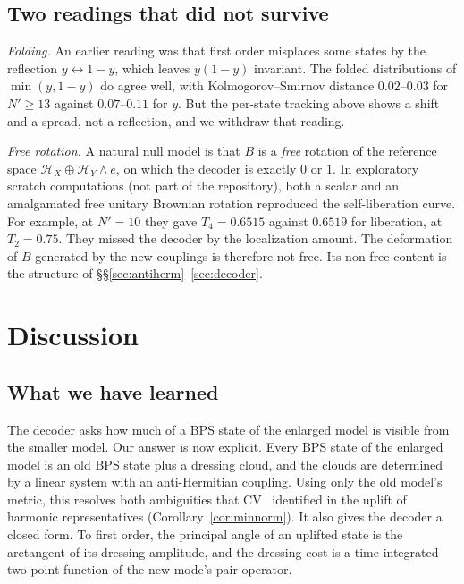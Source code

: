 \documentclass[11pt]{article}
\newcommand{\Np}{N'}
\newcommand{\Hc}{\mathcal H}
\theoremstyle{plain}
\theoremstyle{remark}
\numberwithin{equation}{section}
\begin{document}
\subsection{Two readings that did not survive}

\emph{Folding.} An earlier reading was that first order misplaces some states by the reflection $y\leftrightarrow1-y$,
which leaves $y(1-y)$ invariant. The folded distributions of $\min(y,1-y)$ do agree well, with Kolmogorov--Smirnov
distance $0.02$--$0.03$ for $\Np\ge13$ against $0.07$--$0.11$ for $y$. But the per-state tracking above shows a shift
and a spread, not a reflection, and we withdraw that reading.

\emph{Free rotation.} A natural null model is that $B$ is a \emph{free} rotation of the reference space
$\Hc_X\oplus\Hc_Y\wedge e$, on which the decoder is exactly $0$ or $1$. In exploratory scratch computations (not part of
the repository), both a scalar and an amalgamated free unitary Brownian rotation reproduced the self-liberation curve.
For example, at $\Np=10$ they gave $T_4=0.6515$ against $0.6519$ for liberation, at $T_2=0.75$. They missed the decoder by
the localization amount. The deformation of $B$ generated by the new couplings is therefore not free. Its non-free
content is the structure of \S\S\ref{sec:antiherm}--\ref{sec:decoder}.

\section{Discussion}\label{sec:discussion}

\subsection{What we have learned}

The decoder asks how much of a BPS state of the enlarged model is visible from the smaller model. Our answer is now
explicit. Every BPS state of the enlarged model is an old BPS state plus a dressing cloud, and the clouds are determined
by a linear system with an anti-Hermitian coupling. Using only the old model's metric, this resolves both ambiguities
that CV~\cite{CV} identified in the uplift of harmonic representatives (Corollary~\ref{cor:minnorm}). It also gives the decoder a closed form. To first order,
the principal angle of an uplifted state is the arctangent of its dressing amplitude, and the dressing cost is a
time-integrated two-point function of the new mode's pair operator.
\end{document}
